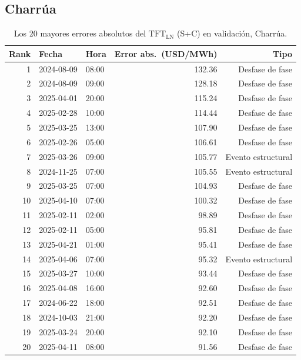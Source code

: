 \clearpage
\subsection{Charrúa}

\begin{table}[htbp]
    \centering
    \small
    \begin{tabular}{rllrr}
        \toprule
        Rank & Fecha       & Hora  & Error abs.\ (USD/MWh) & Tipo \\
        \midrule
 1 & 2024-08-09 & 08:00 & 132.36 & Desfase de fase \\
 2 & 2024-08-09 & 09:00 & 128.18 & Desfase de fase \\
 3 & 2025-04-01 & 20:00 & 115.24 & Desfase de fase \\
 4 & 2025-02-28 & 10:00 & 114.44 & Desfase de fase \\
 5 & 2025-03-25 & 13:00 & 107.90 & Desfase de fase \\
 6 & 2025-02-26 & 05:00 & 106.61 & Desfase de fase \\
 7 & 2025-03-26 & 09:00 & 105.77 & Evento estructural \\
 8 & 2024-11-25 & 07:00 & 105.55 & Evento estructural \\
 9 & 2025-03-25 & 07:00 & 104.93 & Desfase de fase \\
10 & 2025-04-10 & 07:00 & 100.32 & Desfase de fase \\
11 & 2025-02-11 & 02:00 &  98.89 & Desfase de fase \\
12 & 2025-02-11 & 05:00 &  95.81 & Desfase de fase \\
13 & 2025-04-21 & 01:00 &  95.41 & Desfase de fase \\
14 & 2025-04-06 & 07:00 &  95.32 & Evento estructural \\
15 & 2025-03-27 & 10:00 &  93.44 & Desfase de fase \\
16 & 2025-04-08 & 16:00 &  92.60 & Desfase de fase \\
17 & 2024-06-22 & 18:00 &  92.51 & Desfase de fase \\
18 & 2024-10-03 & 21:00 &  92.20 & Desfase de fase \\
19 & 2025-03-24 & 20:00 &  92.10 & Desfase de fase \\
20 & 2025-04-11 & 08:00 &  91.56 & Desfase de fase \\
        \bottomrule
    \end{tabular}
    \vspace{0.2cm}
    \caption{Los 20 mayores errores absolutos del $\text{TFT}_\text{LN}$ (S+C) en validación, Charrúa.}
    \label{tab:top20_charrua}
\end{table}

